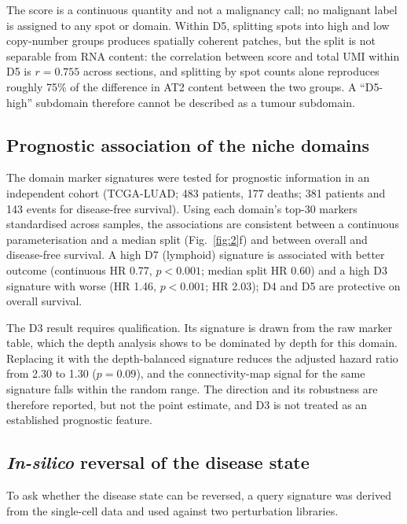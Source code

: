 The score is a continuous quantity and not a malignancy call; no malignant label is assigned
to any spot or domain. Within D5, splitting spots into high and low copy-number groups
produces spatially coherent patches, but the split is not separable from RNA content: the
correlation between score and total UMI within D5 is $r=0.755$ across sections, and
splitting by spot counts
alone reproduces roughly 75\% of the difference in AT2 content between the two groups. A
``D5-high'' subdomain therefore cannot be described as a tumour subdomain.

\subsection{Prognostic association of the niche domains}

The domain marker signatures were tested for prognostic information in an independent cohort
(TCGA-LUAD; 483 patients, 177 deaths; 381 patients and 143 events for disease-free survival).
Using each domain's top-30 markers standardised across samples, the associations are
consistent between a continuous parameterisation and a median split (Fig.~\ref{fig:2}f) and
between overall and disease-free survival. A high D7 (lymphoid) signature is associated with
better outcome (continuous HR 0.77, $p<0.001$; median split HR 0.60) and a high D3 signature
with worse (HR 1.46, $p<0.001$; HR 2.03); D4 and D5 are protective on overall survival.

The D3 result requires qualification. Its signature is drawn from the raw marker table,
which the depth analysis shows to be dominated by depth for this domain. Replacing it with
the depth-balanced signature reduces the adjusted hazard ratio from 2.30 to 1.30
($p=0.09$), and the connectivity-map signal for the same signature falls within the random
range. The direction and its robustness are therefore reported, but not the point estimate,
and D3 is not treated as an established prognostic feature.

\subsection{\emph{In-silico} reversal of the disease state}

To ask whether the disease state can be reversed, a query signature was derived from the
single-cell data and used against two perturbation libraries.

